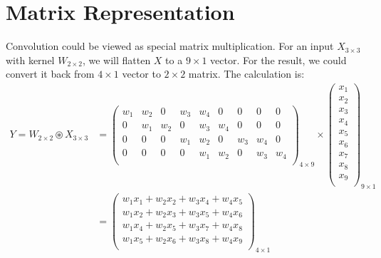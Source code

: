 \section{Matrix Representation}

Convolution could be viewed as special matrix multiplication. For an input $X_{3 \times 3}$ with kernel $W_{2 \times 2}$, we will flatten $X$ to a $9 \times 1$ vector. For the result, we could convert it back from $4 \times 1$ vector to $2 \times 2$ matrix. The calculation is:
\begin{equation}
    \begin{aligned}
        Y = W_{2 \times 2} \circledast X_{3 \times 3} &= \begin{pmatrix}
            w_1 & w_2 & 0 & w_3 & w_4 & 0 & 0 & 0 & 0 \\
            0 & w_1 & w_2 & 0 & w_3 & w_4 & 0 & 0 & 0 \\
            0 & 0 & 0 & w_1 & w_2 & 0 & w_3 & w_4 & 0 \\
            0 & 0 & 0 & 0 & w_1 & w_2 & 0 & w_3 & w_4 \\
        \end{pmatrix}_{4 \times 9} \times \begin{pmatrix}
            x_1 \\
            x_2 \\
            x_3 \\
            x_4 \\
            x_5 \\
            x_6 \\
            x_7 \\
            x_8 \\
            x_9 \\
        \end{pmatrix}_{9 \times 1} \\
        &= \begin{pmatrix}
            w_1 x_1 + w_2 x_2 + w_3 x_4 + w_4 x_5 \\
            w_1 x_2 + w_2 x_3 + w_3 x_5 + w_4 x_6 \\
            w_1 x_4 + w_2 x_5 + w_3 x_7 + w_4 x_8 \\
            w_1 x_5 + w_2 x_6 + w_3 x_8 + w_4 x_9 \\            
        \end{pmatrix}_{4 \times 1}
    \end{aligned}
\end{equation}

